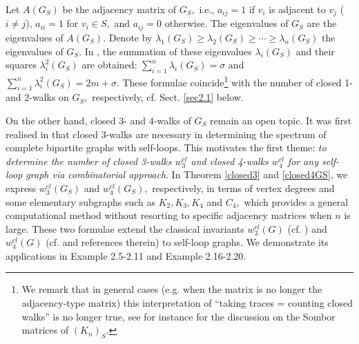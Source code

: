 \documentclass[12pt,a4paper,reqno]{amsart}
\numberwithin{equation}{section}
\theoremstyle{plain}
\theoremstyle{definition}
\newcommand{\<}{\langle}
\renewcommand{\>}{\rangle}
\begin{document}
Let $A(G_S)$ be the adjacency matrix of $G_S,$ i.e., $a_{ij}=1$ if $v_i$ is adjacent to $v_j$ ($i\neq j$), $a_{ii}=1$ for $v_i \in S,$ and $a_{ij}=0$ otherwise. The eigenvalues of $G_S$ are the eigenvalues of $A(G_S).$ Denote by $\lambda_1(G_S) \geq \lambda_2(G_S) \geq \cdots \geq \lambda_n(G_S)$ the eigenvalues of $G_S.$ In \cite{gutman2021energy}, the summation of these eigenvalues $\lambda_i(G_S)$ and their squares $\lambda_i^2(G_S)$ are obtained:
$\sum^n_{i=1} \lambda_i(G_S) = \sigma$ and $\sum^n_{i=1} \lambda_i^2(G_S) = 2m+\sigma.$
These formulae coincide\footnote[2]{We remark that in general cases (e.g. when the matrix is no longer the adjacency-type matrix) this interpretation of ``taking traces = counting closed walks'' is no longer true, see for instance \cite{SomborQuanti2023} for the discussion on the Sombor matrices of $(K_n)_S$.} with the number of closed 1- and 2-walks on $G_S,$ respectively, cf. Sect. \ref{sec2.1} below. %

On the other hand, closed $3$- and $4$-walks of $G_S$ remain an open topic. It was first realised in \cite{akbari2023selfloop} that closed 3-walks are necessary in determining the spectrum of complete bipartite graphs with self-loops. This motivates the first theme: \textit{to determine the number of closed 3-walks $w_3^{cl}$ and closed 4-walks $w_4^{cl}$ for any self-loop graph via combinatorial approach}. In Theorem \ref{closed3} and \ref{closed4GS}, we express $w_3^{cl}(G_S)$ and $w_4^{cl}(G_S),$ respectively, in terms of vertex degrees and some elementary subgraphs such as $K_2, K_3, K_4$ and $C_4,$ which provides a general computational method without resorting to specific adjacency matrices when $n$ is large. These two formulae extend the classical invariants $w_3^{cl}(G)$ (cf. \cite[Result 2h]{biggs1993algebraic}) and $w_4^{cl}(G)$ (cf. \cite{GutmanDas2004} and references therein) to self-loop graphs. We demonstrate its applications in Example 2.5-2.11 and Example 2.16-2.20.
\end{document}
